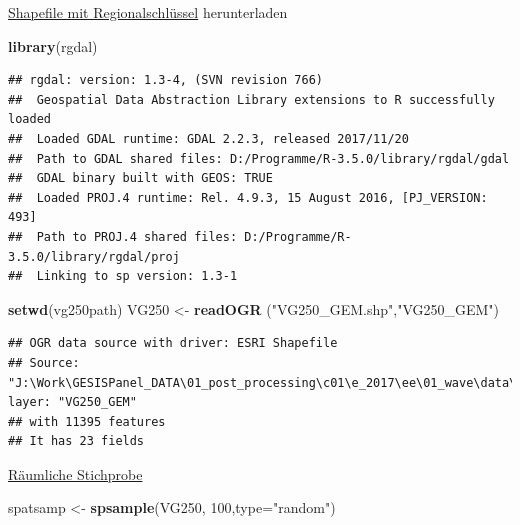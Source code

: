\documentclass[ignorenonframetext,]{beamer}
\newenvironment{Shaded}{\begin{snugshade}}{\end{snugshade}}
\newcommand{\KeywordTok}[1]{\textcolor[rgb]{0.13,0.29,0.53}{\textbf{#1}}}
\newcommand{\DataTypeTok}[1]{\textcolor[rgb]{0.13,0.29,0.53}{#1}}
\newcommand{\DecValTok}[1]{\textcolor[rgb]{0.00,0.00,0.81}{#1}}
\newcommand{\StringTok}[1]{\textcolor[rgb]{0.31,0.60,0.02}{#1}}
\newcommand{\NormalTok}[1]{#1}
\begin{document}
\begin{frame}[fragile]{\href{http://www.geodatenzentrum.de/geodaten/gdz_rahmen.gdz_div?gdz_spr=deu\&gdz_akt_zeile=5\&gdz_anz_zeile=1\&gdz_unt_zeile=13\&gdz_user_id=0}{Shapefile
mit Regionalschlüssel} herunterladen}

\begin{Shaded}
\begin{Highlighting}[]
\KeywordTok{library}\NormalTok{(rgdal)}
\end{Highlighting}
\end{Shaded}

\begin{verbatim}
## rgdal: version: 1.3-4, (SVN revision 766)
##  Geospatial Data Abstraction Library extensions to R successfully loaded
##  Loaded GDAL runtime: GDAL 2.2.3, released 2017/11/20
##  Path to GDAL shared files: D:/Programme/R-3.5.0/library/rgdal/gdal
##  GDAL binary built with GEOS: TRUE 
##  Loaded PROJ.4 runtime: Rel. 4.9.3, 15 August 2016, [PJ_VERSION: 493]
##  Path to PROJ.4 shared files: D:/Programme/R-3.5.0/library/rgdal/proj
##  Linking to sp version: 1.3-1
\end{verbatim}

\begin{Shaded}
\begin{Highlighting}[]
\KeywordTok{setwd}\NormalTok{(vg250path)}
\NormalTok{VG250 <-}\StringTok{ }\KeywordTok{readOGR}\NormalTok{ (}\StringTok{"VG250_GEM.shp"}\NormalTok{,}\StringTok{"VG250_GEM"}\NormalTok{)}
\end{Highlighting}
\end{Shaded}

\begin{verbatim}
## OGR data source with driver: ESRI Shapefile 
## Source: "J:\Work\GESISPanel_DATA\01_post_processing\c01\e_2017\ee\01_wave\data\com\geodata\vg250\VG250_GEM.shp", layer: "VG250_GEM"
## with 11395 features
## It has 23 fields
\end{verbatim}

\end{frame}

\begin{frame}[fragile]{\href{https://www.rdocumentation.org/packages/sp/versions/1.3-1/topics/spsample}{Räumliche
Stichprobe}}

\begin{Shaded}
\begin{Highlighting}[]
\NormalTok{spatsamp <-}\StringTok{ }\KeywordTok{spsample}\NormalTok{(VG250, }\DecValTok{100}\NormalTok{,}\DataTypeTok{type=}\StringTok{"random"}\NormalTok{)}
\end{Highlighting}
\end{Shaded}

\end{frame}
\end{document}
